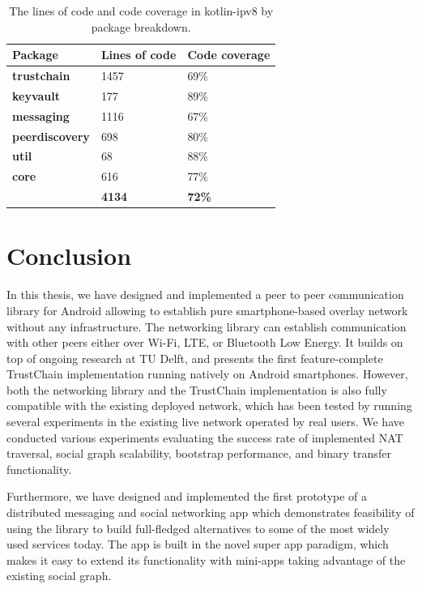\begin{table}[h]
    \centering
    \begin{tabular}{ | l | l | l | }
        \hline
        \textbf{Package} & \textbf{Lines of code} & \textbf{Code coverage} \\
        \hline
        \textbf{trustchain} & 1457 & 69\% \\
        \textbf{keyvault} & 177 & 89\% \\
        \textbf{messaging} & 1116 & 67\% \\
        \textbf{peerdiscovery} & 698 & 80\% \\
        \textbf{util} & 68 & 88\% \\
        \textbf{core} & 616 & 77\% \\
        \hline
        & \textbf{4134} & \textbf{72\%} \\
        \hline
    \end{tabular}
    \caption{The lines of code and code coverage in kotlin-ipv8 by package breakdown.}
    \label{codecov}
\end{table}



\chapter{Conclusion}
\label{conclusion}

In this thesis, we have designed and implemented a peer to peer communication library for Android allowing to establish pure smartphone-based overlay network without any infrastructure. The networking library can establish communication with other peers either over Wi-Fi, LTE, or Bluetooth Low Energy. It builds on top of ongoing research at TU Delft, and presents the first feature-complete TrustChain implementation running natively on Android smartphones. However, both the networking library and the TrustChain implementation is also fully compatible with the existing deployed network, which has been tested by running several experiments in the existing live network operated by real users. We have conducted various experiments evaluating the success rate of implemented NAT traversal, social graph scalability, bootstrap performance, and binary transfer functionality.

Furthermore, we have designed and implemented the first prototype of a distributed messaging and social networking app which demonstrates feasibility of using the library to build full-fledged alternatives to some of the most widely used services today. The app is built in the novel super app paradigm, which makes it easy to extend its functionality with mini-apps taking advantage of the existing social graph.

